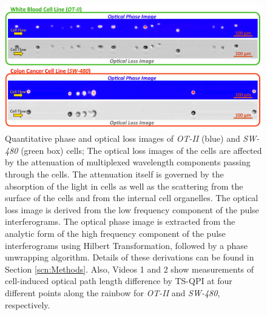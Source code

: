\documentclass[aps,pra,reprint,longbibliography,superscriptaddress]{revtex4-1}
\begin{document}
\begin{figure}
\end{figure}

\begin{figure}
\includegraphics[scale=0.2]{Figure2DImage.jpg}
\caption{\label{fig:2DImage} Quantitative phase and optical loss images of \textit{OT-II} (blue) and \textit{SW-480} (green box) cells; The optical loss images of the cells are affected by the attenuation of multiplexed wavelength components passing through the cells. The attenuation itself is governed by the absorption of the light in cells as well as the scattering from the surface of the cells and from the internal cell organelles. The optical loss image is derived from the low frequency component of the pulse interferograms. The optical phase image is extracted from the analytic form of the high frequency component of the pulse interferograms using Hilbert Transformation, followed by a phase unwrapping algorithm. Details of these derivations can be found in Section \ref{scn:Methods}. Also, Videos 1 and 2 show measurements of cell-induced optical path length difference by TS-QPI at four different points along the rainbow for \textit{OT-II} and \textit{SW-480}, respectively.}
\end{figure}
\end{document}
